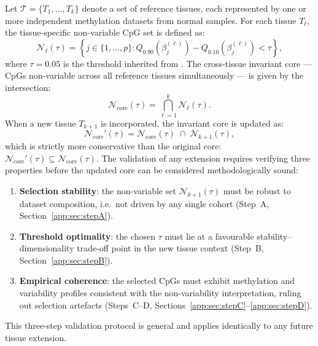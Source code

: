 Let $\mathcal{T} = \{T_1, \dots, T_k\}$ denote a set of reference 
tissues, each represented by one or more independent methylation 
datasets from normal samples. For each tissue $T_\ell$, the 
tissue-specific non-variable CpG set is defined as:
\begin{equation}
    \mathcal{N}_\ell(\tau)
    =
    \left\{
    j \in \{1,\dots,p\} :
    Q_{0.90}\!\left(\beta_j^{(\ell)}\right)
    -
    Q_{0.10}\!\left(\beta_j^{(\ell)}\right)
    < \tau
    \right\},
    \label{eq:nv_tissue}
\end{equation}
where $\tau = 0.05$ is the threshold inherited from 
\cite{Edgar2017}. The cross-tissue invariant core — CpGs 
non-variable across all reference tissues simultaneously — is 
given by the intersection:
\begin{equation}
    \mathcal{N}_{\mathrm{core}}(\tau)
    =
    \bigcap_{\ell=1}^{k} \mathcal{N}_\ell(\tau).
    \label{eq:nv_core}
\end{equation}
When a new tissue $T_{k+1}$ is incorporated, the invariant 
core is updated as:
\begin{equation}
    \mathcal{N}_{\mathrm{core}}'(\tau)
    =
    \mathcal{N}_{\mathrm{core}}(\tau)
    \;\cap\;
    \mathcal{N}_{k+1}(\tau),
    \label{eq:nv_update}
\end{equation}
which is strictly more conservative than the original core: 
$\mathcal{N}_{\mathrm{core}}'(\tau) \subseteq 
\mathcal{N}_{\mathrm{core}}(\tau)$.
The validation of any extension requires verifying three 
properties before the updated core can be considered 
methodologically sound:
\begin{enumerate}
    \item \textbf{Selection stability}: the non-variable set 
    $\mathcal{N}_{k+1}(\tau)$ must be robust to dataset 
    composition, i.e.\ not driven by any single cohort 
    (Step~A, Section~\ref{app:sec:stepA}).
    \item \textbf{Threshold optimality}: the chosen $\tau$ 
    must lie at a favourable stability--dimensionality 
    trade-off point in the new tissue context 
    (Step~B, Section~\ref{app:sec:stepB}).
    \item \textbf{Empirical coherence}: the selected CpGs 
    must exhibit methylation and variability profiles 
    consistent with the non-variability interpretation, 
    ruling out selection artefacts 
    (Steps~C--D, Sections~\ref{app:sec:stepC}--\ref{app:sec:stepD}).
\end{enumerate}
This three-step validation protocol is general and applies 
identically to any future tissue extension.

